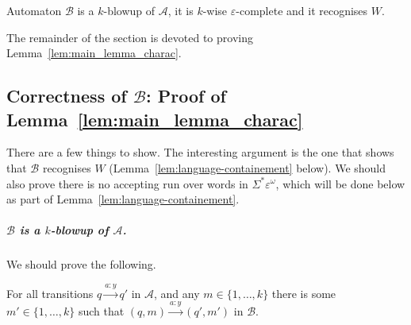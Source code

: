 \documentclass[a4paper,UKenglish,cleveref, thm-restate]{lipics-v2021}
\newcommand{\re}[1]{\xrightarrow{#1}}
\newcommand{\eps}{\varepsilon}
\newcommand{\A}{\mathcal{A}}
\newcommand{\B}{\mathcal B}
\begin{document}
\begin{lemma}\label{lem:main_lemma_charac}
Automaton $\B$ is a $k$-blowup of $\A$, it is $k$-wise $\eps$-complete and it recognises $W$.
\end{lemma}
The remainder of the section is devoted to proving Lemma~\ref{lem:main_lemma_charac}.

\subsection{Correctness of $\B$: Proof of Lemma~\ref{lem:main_lemma_charac}}

There are a few things to show.
The interesting argument is the one that shows that $\B$ recognises $W$ (Lemma~\ref{lem:language-containement} below).
We should also prove there is no accepting run over words in $\Sigma^*\eps^\omega$, which will be done below as part of Lemma~\ref{lem:language-containement}.

\subparagraph*{$\B$ is a $k$-blowup of $\A$.}

We should prove the following.

\begin{claim}
    For all transitions $q \re{a:y} q'$ in $\A$, and any $m \in \{1,\dots,k\}$ there is some $m' \in\{1,\dots,k\}$ such that $(q,m) \re{a:y} (q',m')$ in $\B$.
\end{claim}
\end{document}
